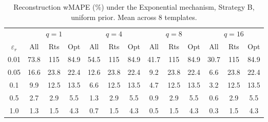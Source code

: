 \begin{table}[h]
\centering
\setlength{\tabcolsep}{2.5pt}
\small
\caption{Reconstruction wMAPE (\%) under the Exponential mechanism, Strategy B, uniform prior. Mean across 8 templates.}
\label{tab:rq2_exp_B_uniform}
\begin{tabular}{c|ccc|ccc|ccc|ccc}
\toprule
 & \multicolumn{3}{c|}{$q=1$} & \multicolumn{3}{c|}{$q=4$} & \multicolumn{3}{c|}{$q=8$} & \multicolumn{3}{c}{$q=16$} \\
$\varepsilon_r$ & All & Rts & Opt & All & Rts & Opt & All & Rts & Opt & All & Rts & Opt \\
\midrule
0.01 & 73.8 & 115 & 84.9 & 54.5 & 115 & 84.9 & 41.7 & 115 & 84.9 & 30.7 & 115 & 84.9 \\
0.05 & 16.6 & 23.8 & 22.4 & 12.6 & 23.8 & 22.4 & 9.2 & 23.8 & 22.4 & 6.6 & 23.8 & 22.4 \\
0.1 & 9.9 & 12.5 & 13.5 & 6.6 & 12.5 & 13.5 & 4.7 & 12.5 & 13.5 & 3.2 & 12.5 & 13.5 \\
0.5 & 2.7 & 2.9 & 5.5 & 1.3 & 2.9 & 5.5 & 0.9 & 2.9 & 5.5 & 0.6 & 2.9 & 5.5 \\
1.0 & 1.3 & 1.5 & 4.3 & 0.7 & 1.5 & 4.3 & 0.5 & 1.5 & 4.3 & 0.3 & 1.5 & 4.3 \\
\bottomrule
\end{tabular}
\end{table}
